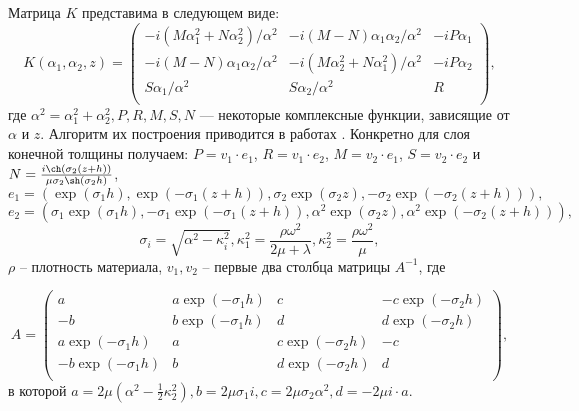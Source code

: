 \documentclass[a4paper, 12pt]{article}
\begin{document}
Матрица $K$ представима в следующем виде:
\begin{equation}
    K(\alpha_1, \alpha_2,z)=
\begin{pmatrix} 
    -i\left( M \alpha_1^2 +N \alpha_2^2\right)/\alpha^2 & -i(M-N)\alpha_1 \alpha_2 /\alpha^2&-iP\alpha_1\\ 
    -i(M-N)\alpha_1 \alpha_2 /\alpha^2& -i\left( M \alpha_2^2 +N \alpha_1^2\right) /\alpha^2&-iP\alpha_2\\
    S\alpha_1 /\alpha^2&S\alpha_2 /\alpha^2& R \\
\end{pmatrix},
\label{K1}
\end{equation}
где $\alpha^2=\alpha_1^2+\alpha_2^2, P,R,M,S,N$ --- некоторые комплексные функции, зависящие от $\alpha$ и $z$.
Алгоритм их построения приводится в работах \cite{g89,g90}. Конкретно для слоя конечной толщины получаем: $P=v_1 \cdot e_1$, $R=v_1 \cdot e_2$, $M=v_2 \cdot e_1$, $S=v_2 \cdot e_2$ и
$N=\frac{i \ch (\sigma_2(z+h))}{\mu \sigma_2 \sh(\sigma_2 h)}$,
\begin{equation*}
    e_1=(\exp(\sigma_1 h),\exp(-\sigma_1(z+h)), \sigma_2 \exp(\sigma_2 z), -\sigma_2\exp(-\sigma_2(z+h))),
\end{equation*}
\begin{equation*}
    e_2=(\sigma_1 \exp(\sigma_1 h),-\sigma_1 \exp(-\sigma_1(z+h)), \alpha^2 \exp(\sigma_2 z), \alpha^2 \exp(-\sigma_2(z+h))),
\end{equation*}
\begin{equation*}
    \sigma_i=\sqrt{\alpha^2 - \kappa^2_i}, \kappa^2_1=\dfrac{\rho \omega^2}{2\mu+\lambda},\kappa^2_2=\dfrac{\rho \omega^2}{\mu},
\end{equation*}
$\rho$ -- плотность материала, $v_1,v_2$ -- первые два столбца матрицы $A^{-1}$, где

\begin{equation*}
     A = 
    \begin{pmatrix}
        a & a\exp(-\sigma_1 h) & c & -c \exp(-\sigma_2 h)\\
        -b & b\exp(-\sigma_1 h) & d & d \exp(-\sigma_2 h)\\
        a \exp(-\sigma_1 h)& a & c\exp(-\sigma_2 h) & -c \\
        -b \exp(-\sigma_1 h) & b& d\exp(-\sigma_2 h)& d\\
    \end{pmatrix},    
\end{equation*}
в которой $a=2\mu (\alpha^2 - \frac{1}{2} \kappa^2_2), b= 2\mu \sigma_1 i, c= 2\mu \sigma_2 \alpha^2, d= - 2\mu i \cdot a$.
\end{document}

